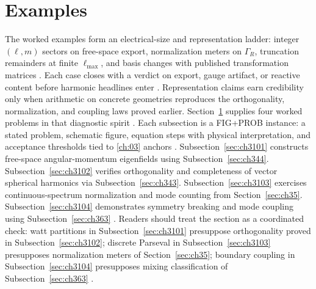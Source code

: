 \section{Examples}
\label{sec:ch310}
The worked examples form an electrical-size and representation ladder: integer $(\ell,m)$ sectors on free-space export, normalization meters on $\Gamma_R$, truncation remainders at finite $\ell_{\max}$, and basis changes with published transformation matrices \cite{stratton1941,hansen1988,belinfante1940}. Each case closes with a verdict on export, gauge artifact, or reactive content before harmonic headlines enter \cite{poynting1884}.
Representation claims earn credibility only when arithmetic on concrete geometries reproduces the
orthogonality, normalization, and coupling laws proved earlier. Section~\ref{sec:ch310} supplies four
worked problems in that diagnostic spirit \cite{stratton1941}. Each subsection is a FIG+PROB instance:
a stated problem, schematic figure, equation steps with physical interpretation, and acceptance thresholds tied to
\ref{ch:03} anchors \cite{harrington2001}. Subsection~\ref{sec:ch3101}
constructs free-space angular-momentum eigenfields using Subsection~\ref{sec:ch344}. Subsection~\ref{sec:ch3102}
verifies orthogonality and completeness of vector spherical harmonics via Subsection~\ref{sec:ch343}.
Subsection~\ref{sec:ch3103} exercises continuous-spectrum normalization and mode counting from
Section~\ref{sec:ch35}. Subsection~\ref{sec:ch3104} demonstrates symmetry breaking and mode coupling using
Subsection~\ref{sec:ch363} \cite{harrington2001}. Readers should treat the section as a coordinated check:
watt partitions in Subsection~\ref{sec:ch3101} presuppose orthogonality proved in Subsection~\ref{sec:ch3102}; discrete
Parseval in Subsection~\ref{sec:ch3103} presupposes normalization meters of Section~\ref{sec:ch35}; boundary coupling in
Subsection~\ref{sec:ch3104} presupposes mixing classification of Subsection~\ref{sec:ch363} \cite{hansen1988}.
